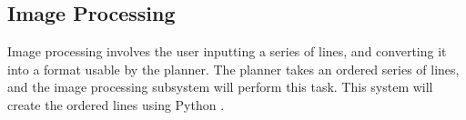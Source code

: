 
\subsection{Image Processing}
\label{sec:software_image}
Image processing involves the user inputting a series of lines, and converting it into a format usable by the planner. The planner takes an ordered series of lines, and the image processing subsystem will perform this task. This system will create the ordered lines using Python \cite{python27}.